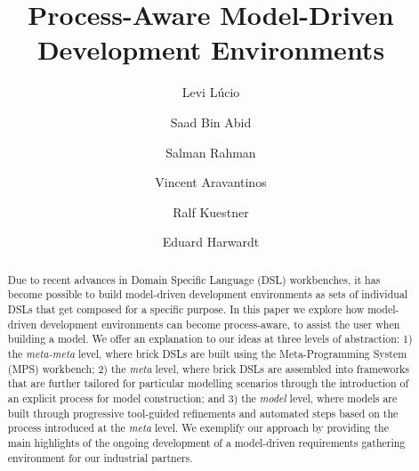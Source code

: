 \documentclass{llncs}
\begin{document}
%
\frontmatter          %

\mainmatter              %
%
\title{Process-Aware Model-Driven Development Environments}
%
\titlerunning{}  %
%
\author{Levi L\'ucio \and Saad Bin Abid
 \and Salman Rahman \and Vincent
Aravantinos \and Ralf Kuestner\and Eduard Harwardt}
%
\authorrunning{} %
%
\tocauthor{}
%

\maketitle            
\begin{abstract}
\vspace{-.7cm}
Due to recent advances in Domain Specific Language (DSL) workbenches, it has
become possible to build model-driven development environments as sets of
individual DSLs that get composed for a specific purpose.
In this paper we explore how model-driven development environments can
become process-aware, to assist the user when building a model.
We offer an explanation to our ideas at three levels of abstraction:
1) the \emph{meta-meta} level, where brick DSLs are built using the
Meta-Programming System (MPS) workbench; 2) the \emph{meta} level, where brick
DSLs are assembled into frameworks that are further tailored for
particular modelling scenarios through the introduction of an explicit process
for model construction; and 3) the \emph{model} level, where
models are built through progressive tool-guided refinements and automated
steps based on the process introduced at the \emph{meta} level.
We exemplify our approach by providing the main highlights of the ongoing
development of a model-driven requirements gathering environment for our
industrial partners.
\vspace{-.7cm}
\end{abstract} 
\end{document}
